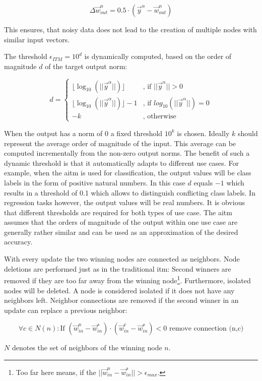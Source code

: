 \begin{equation}
\Delta\vec{w}^n_{out} = 0.5 \cdot (\vec{y}^\alpha - \vec{w}^n_{out})
\end{equation}

This ensures, that noisy data does not lead to the creation of multiple nodes with similar input vectors. 

The threshold $\epsilon_{ITM} = 10^d$ is dynamically computed, based on the order of magnitude $d$ of the target output norm:

\begin{equation}
d = \begin{cases}
\lfloor\log_{10}(||\vec{y}^\alpha||)\rfloor & \text{, if $||\vec{y}^\alpha|| > 0$} \\
\lfloor\log_{10}(||\vec{y}^\alpha||)\rfloor-1 & \text{, if $log_{10}(||\vec{y}^\alpha||) = 0$} \\
-k & \text{, otherwise}
\end{cases}
\end{equation}

When the output has a norm of $0$ a fixed threshold $10^k$ is chosen. Ideally $k$ should represent the average order of magnitude of the input. This average can be computed incrementally from the non-zero output norms. The benefit of such a dynamic threshold is that it automatically adapts to different use cases. For example, when the \gls{aitm} is used for classification, the output values will be class labels in the form of positive natural numbers. In this case $d$ equals $-1$ which results in a threshold of 0.1 which allows to distinguish conflicting class labels.
In regression tasks however, the output values will be real numbers. It is obvious that different thresholds are required for both types of use case. The \gls{aitm} assumes that the orders of magnitude of the output within one use case are generally rather similar and can be used as an approximation of the desired accuracy.

With every update the two winning nodes are connected as neighbors. Node deletions are performed just as in the traditional \gls{itm}: Second winners are removed if they are too far away from the winning node\footnote{Too far here means, if the $||\vec{w}^n_{in} - \vec{w}^s_{in}|| > \epsilon_{max}$. }. Furthermore, isolated nodes will be deleted. A node is considered isolated if it does not have any neighbors left. Neighbor connections are removed if the second winner in an update can replace a previous neighbor:

\begin{equation}
\forall c \in N(n): \text{If~} (\vec{w}^n_{in}-\vec{w}^s_{in}) \cdot (\vec{w}^c_{in}-\vec{w}^s_{in}) < 0 \text{~remove connection (n,c)}
\end{equation}

$N$ denotes the set of neighbors of the winning node $n$.

